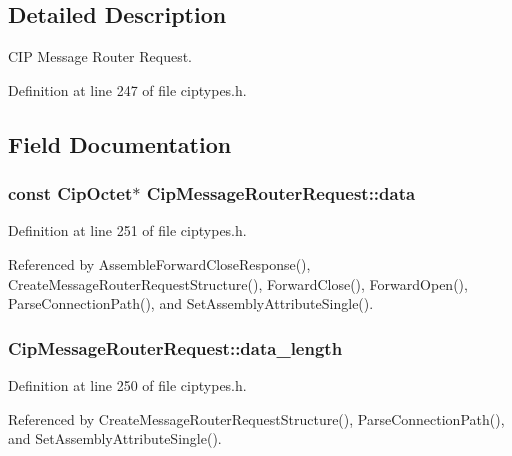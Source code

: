\subsection{\-Detailed \-Description}
\-C\-I\-P \-Message \-Router \-Request. 



\-Definition at line 247 of file ciptypes.\-h.



\subsection{\-Field \-Documentation}
\hypertarget{structCipMessageRouterRequest_ab54e41e4534613f0b0e8b2eb0de96102}{
\subsubsection[{data}]{\setlength{\rightskip}{0pt plus 5cm}const {\bf \-Cip\-Octet}$\ast$ {\bf \-Cip\-Message\-Router\-Request\-::data}}}\label{dc/d16/structCipMessageRouterRequest_ab54e41e4534613f0b0e8b2eb0de96102}


\-Definition at line 251 of file ciptypes.\-h.



\-Referenced by \-Assemble\-Forward\-Close\-Response(), \-Create\-Message\-Router\-Request\-Structure(), \-Forward\-Close(), \-Forward\-Open(), \-Parse\-Connection\-Path(), and \-Set\-Assembly\-Attribute\-Single().

\hypertarget{structCipMessageRouterRequest_a6dfa9c012859e0b0fe18e1501cfce9b6}{
\subsubsection[{data\-\_\-length}]{ {\bf \-Cip\-Message\-Router\-Request\-::data\-\_\-length}}}\label{dc/d16/structCipMessageRouterRequest_a6dfa9c012859e0b0fe18e1501cfce9b6}


\-Definition at line 250 of file ciptypes.\-h.



\-Referenced by \-Create\-Message\-Router\-Request\-Structure(), \-Parse\-Connection\-Path(), and \-Set\-Assembly\-Attribute\-Single().

